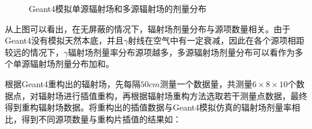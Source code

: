 \begin{figure}[htbp]
    \caption{Geant4模拟单源辐射场和多源辐射场的剂量分布}
    \label{Geant4模拟单源辐射场和多源辐射场的剂量分布}
\end{figure}

从上图可以看出，在无屏蔽的情况下，辐射场剂量分布与源项数量相关。由于Geant4没有模拟天然本底，并且$ \gamma $射线在空气中有一定衰减，因此在各个源项相距较远的情况下，$ \gamma $辐射场剂量率分布源项越多，多源辐射场剂量分布可以看作为多个单源辐射场剂量分布加和。

根据Geant4重构出的辐射场，先每隔$ 50cm $测量一个数据量，共测量$ 6 \times 8 \times 10 $个数据点，对辐射场进行插值重构，再根据辐射场重构方法选取若干测量点数据，最终得到重构辐射场数据。将重构出的插值数据与Geant4模拟仿真的辐射场剂量率相比，得到不同源项数量与重构片插值的结果如：

